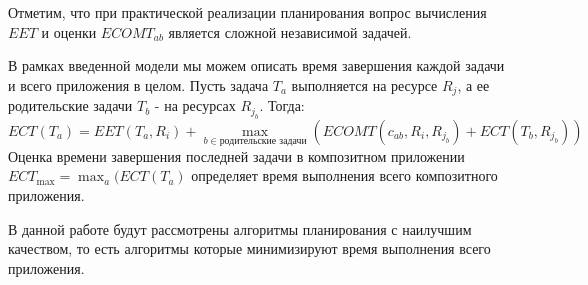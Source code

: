 \begin{spacing}{1.4}
Отметим, что при практической реализации планирования вопрос вычисления $EET$ и оценки $ECOMT_{ab}$ является сложной независимой задачей.



В рамках введенной модели мы можем описать время завершения каждой задачи и всего приложения в целом. Пусть задача $T_a$ выполняется на ресурсе $R_j$, а ее родительские задачи $T_b$ - на ресурсах $R_{j_b}$. Тогда:
$$
ECT(T_a) = EET(T_a, R_i) + \max_{b \in \text{родительские задачи}} (ECOMT(c_{ab}, R_i, R_{j_b}) + ECT (T_b, R_{j_b})) 
$$
Оценка времени завершения последней задачи в композитном приложении $ECT_{\max} = \max_a (ECT(T_a)$ определяет время выполнения всего композитного приложения. 

В данной работе будут рассмотрены алгоритмы планирования с наилучшим качеством, то есть алгоритмы которые минимизируют время выполнения всего  приложения.




\end{spacing}